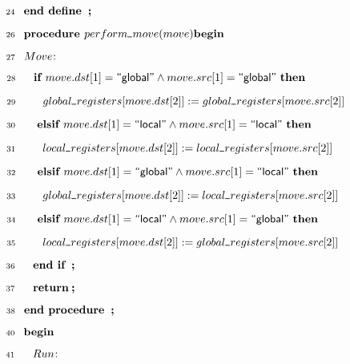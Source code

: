 \documentclass{article}
\makeatletter
\newcommand{\p@semicolon}{\textbf{\,; }}
\newcommand{\p@begin}{\textbf{begin }}
\newcommand{\p@end}{\textbf{end }}
\newcommand{\p@define}{\textbf{define }}
\newcommand{\p@if}{\textbf{if }}
\newcommand{\p@then}{\,\,\textbf{then }}
\newcommand{\p@elsif}{\,\,\textbf{elsif }}
\newcommand{\p@procedure}{\textbf{procedure }}
\newcommand{\p@return}{\textbf{return}}
\renewcommand{\_}{\rule{.4em}{.06em}\hspace{.05em}}
\newif\ifpcalshading \pcalshadingfalse
\newlength{\pcalvspace}\setlength{\pcalvspace}{0pt}%
\newcommand{\@pvspace}[1]{%
  \ifpcalshading
     \par\global\setlength{\pcalvspace}{#1}%
  \else
     \par\vspace{#1}%
  \fi
}
\renewcommand{\.}[1]{\ensuremath{\mbox{}#1\mbox{}}}
\newcommand{\@s}[1]{\hspace{#1pt}}
\newlength{\@xlen}
\newcommand\xtstrut%
  {\setlength{\@xlen}{1.05em}%
   \addtolength{\@xlen}{\pcalvspace}%
    \raisebox{\vshadelen}{\raisebox{-.25em}{\rule{0pt}{\@xlen}}}%
   \global\setlength{\vshadelen}{0pt}%
   \global\setlength{\pcalvspace}{0pt}}
\newcommand{\@x}[1]{\par
  \ifpcalshading
  \makebox[0pt][l]{\shadebox{\xtstrut\hspace*{\textwidth}}}%
  \fi
  \mbox{$\mbox{}#1\mbox{}$}}
\newcommand{\@w}[1]{\textsf{``{#1}''}}
\def\graymargin{1}
\newlength{\templena}
\newlength{\templenb}
\newcommand{\shadebox}[1]{{\setlength{\fboxsep}{\graymargin pt}%
     \savebox{\tempboxa}{#1}%
     \settoheight{\templena}{\usebox{\tempboxa}}%
     \settodepth{\templenb}{\usebox{\tempboxa}}%
     \hspace*{-\fboxsep}\raisebox{0pt}[\templena][\templenb]%
        {\colorbox{boxshade}{\usebox{\tempboxa}}}\hspace*{-\fboxsep}}}
\newlength{\vshadelen}
\makeatother
\begin{document}
\@pvspace{8.0pt}%
 \@x{\makebox[0pt][r]{\scriptsize 24\hspace{1em}} {\p@end} {\p@define}
 {\p@semicolon}}%
\@pvspace{8.0pt}%
 \@x{\makebox[0pt][r]{\scriptsize 26\hspace{1em}} {\p@procedure} perform\_move
 ( move ) {\p@begin}}%
\@x{\makebox[0pt][r]{\scriptsize 27\hspace{1em}} Move\@s{.5}\textrm{:}\@s{3}}%
 \@x{\makebox[0pt][r]{\scriptsize 28\hspace{1em}}\@s{8.2} {\p@if} move . dst [
 1 ] \.{=}\@w{global} \.{\land} move . src [ 1 ] \.{=}\@w{global} {\p@then}}%
 \@x{\makebox[0pt][r]{\scriptsize 29\hspace{1em}}\@s{16.4} global\_registers [
 move . dst [ 2 ] ] \.{:=} global\_registers [ move . src [ 2 ] ]}%
 \@x{\makebox[0pt][r]{\scriptsize 30\hspace{1em}}\@s{8.2} {\p@elsif} move .
 dst [ 1 ] \.{=}\@w{local} \.{\land} move . src [ 1 ] \.{=}\@w{local}
 {\p@then}}%
 \@x{\makebox[0pt][r]{\scriptsize 31\hspace{1em}}\@s{16.4} local\_registers [
 move . dst [ 2 ] ] \.{:=} local\_registers [ move . src [ 2 ] ]}%
 \@x{\makebox[0pt][r]{\scriptsize 32\hspace{1em}}\@s{8.2} {\p@elsif} move .
 dst [ 1 ] \.{=}\@w{global} \.{\land} move . src [ 1 ] \.{=}\@w{local}
 {\p@then}}%
 \@x{\makebox[0pt][r]{\scriptsize 33\hspace{1em}}\@s{16.4} global\_registers [
 move . dst [ 2 ] ] \.{:=} local\_registers [ move . src [ 2 ] ]}%
 \@x{\makebox[0pt][r]{\scriptsize 34\hspace{1em}}\@s{8.2} {\p@elsif} move .
 dst [ 1 ] \.{=}\@w{local} \.{\land} move . src [ 1 ] \.{=}\@w{global}
 {\p@then}}%
 \@x{\makebox[0pt][r]{\scriptsize 35\hspace{1em}}\@s{16.4} local\_registers [
 move . dst [ 2 ] ] \.{:=} global\_registers [ move . src [ 2 ] ]}%
 \@x{\makebox[0pt][r]{\scriptsize 36\hspace{1em}}\@s{8.2} {\p@end} {\p@if}
 {\p@semicolon}}%
 \@x{\makebox[0pt][r]{\scriptsize 37\hspace{1em}}\@s{8.2} {\p@return}\@s{0.43}
 {\p@semicolon}}%
 \@x{\makebox[0pt][r]{\scriptsize 38\hspace{1em}} {\p@end} {\p@procedure}
 {\p@semicolon}}%
\@pvspace{8.0pt}%
\@x{\makebox[0pt][r]{\scriptsize 40\hspace{1em}} {\p@begin}}%
 \@x{\makebox[0pt][r]{\scriptsize 41\hspace{1em}}\@s{8.2}
 Run\@s{.5}\textrm{:}\@s{3}}%
\end{document}
